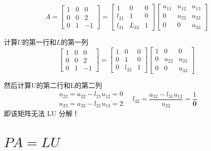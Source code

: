 \begin{example}
    $$ A=\left[\begin{array}{ccc}1 & 0 & 0 \\ 0 & 0 & 2 \\ 0 & 1 & -1\end{array}\right]=\left[\begin{array}{ccc}1 & 0 & 0 \\ l_{21} & 1 & 0 \\ l_{31} & L_{32} & 1\end{array}\right]\left[\begin{array}{ccc}u_{11} & u_{12} & u_{13} \\ 0 & u_{22} & u_{23} \\ 0 & 0 & u_{33}\end{array}\right] $$

    计算$U$的第一行和$L$的第一列
    $$
        \left[\begin{array}{ccc}
                1 & 0 & 0  \\
                0 & 0 & 2  \\
                0 & 1 & -1
            \end{array}\right]=\left[\begin{array}{ccc}
                1 & 0      & 0 \\
                0 & 1      & 0 \\
                0 & l_{32} & 1
            \end{array}\right]\left[\begin{array}{ccc}
                1 & 0      & 0      \\
                0 & u_{22} & u_{23} \\
                0 & 0      & u_{33}
            \end{array}\right]
    $$

    然后计算U的第二行和L的第二列
    $$
        \begin{array}{l}
            u_{22}=a_{22}-l_{21} u_{12}=0 \\
            u_{23}=a_{23}-l_{21} u_{13}=2
        \end{array} \quad l_{32}=\frac{a_{32}-l_{31} u_{12}}{u_{22}}=\frac{1}{\boldsymbol{0}}
    $$
    即该矩阵无法 $ \mathrm{LU} $ 分解！
\end{example}

\section{\texorpdfstring{$PA=LU$}{PA=LU}}

